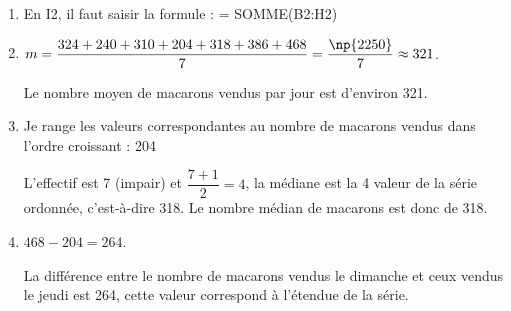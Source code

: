 
\medskip

\begin{enumerate}
\item En I2, il faut saisir la formule : = SOMME(B2:H2)
\item  $m =  \dfrac{324+240+310+204+318+386+468}{7} = \dfrac{\np{2250}}{7} \approx 321$.

Le nombre moyen de macarons vendus par jour est d'environ 321.
\item  Je range les valeurs correspondantes au nombre de macarons vendus dans l'ordre
croissant : 204 

L'effectif est 7 (impair) et $\dfrac{7 + 1}{2} = 4$, la médiane est la 4 valeur de la série ordonnée, c'est-à-dire 318.  Le nombre médian de macarons est donc de 318.
\item  $468 - 204 = 264$.

La différence entre le nombre de macarons vendus le dimanche et ceux vendus le jeudi
est 264, cette valeur correspond à l'étendue de la série.
\end{enumerate}

\vspace{0,5cm}

